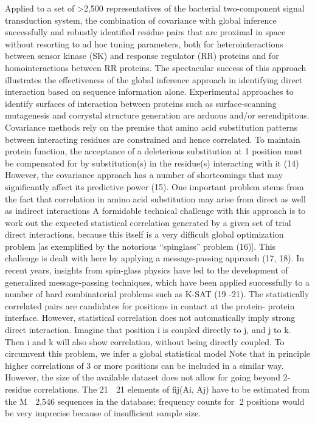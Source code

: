 Applied to a set of >2,500 representatives of the bacterial two-component signal transduction system, the combination of covariance with global inference successfully and robustly identified residue pairs that are proximal in space without resorting to ad hoc tuning parameters, both for heterointeractions between sensor kinase (SK) and response regulator (RR) proteins and for homointeractions between RR proteins. \cite{weigt2009identification}
The spectacular success of this approach illustrates the effectiveness of the global inference approach in identifying direct interaction based on sequence information alone. \cite{weigt2009identification}
Experimental approaches to identify surfaces of interaction between proteins such as surface-scanning mutagenesis and cocrystal structure generation are arduous and/or serendipitous. \cite{weigt2009identification}
Covariance methods rely on the premise that amino acid substitution patterns between interacting residues are constrained and hence correlated. To maintain protein function, the acceptance of a deleterious substitution at 1 position must be compensated for by substitution(s) in the residue(s) interacting with it (14) \cite{weigt2009identification}
However, the covariance approach has a number of shortcomings that may significantly affect its predictive power (15). One important problem stems from the fact that correlation in amino acid substitution may arise from direct as well as indirect interactions \cite{weigt2009identification}
A formidable technical challenge with this approach is to work out the expected statistical correlation generated by a given set of trial direct interactions, because this itself is a very difficult global optimization problem [as exemplified by the notorious ``spinglass'' problem (16)]. This challenge is dealt with here by applying a message-passing approach (17, 18). In recent years, insights from spin-glass physics have led to the development of generalized message-passing techniques, which have been applied successfully to a number of hard combinatorial problems such as K-SAT (19 -21). \cite{weigt2009identification}
The statistically correlated pairs are candidates for positions in contact at the protein- protein interface. However, statistical correlation does not automatically imply strong direct interaction. Imagine that position i is coupled directly to j, and j to k. Then i and k will also show correlation, without being directly coupled.  \cite{weigt2009identification}
To circumvent this problem, we infer a global statistical model  \cite{weigt2009identification}
Note that in principle higher correlations of 3 or more positions can be included in a similar way. However, the size of the available dataset does not allow for going beyond 2-residue correlations. The 21 􏰐 21 elements of fij(Ai, Aj) have to be estimated from the M 􏰈 2,546 sequences in the database; frequency counts for 􏰆2 positions would be very imprecise because of insufficient sample size. \cite{weigt2009identification}
